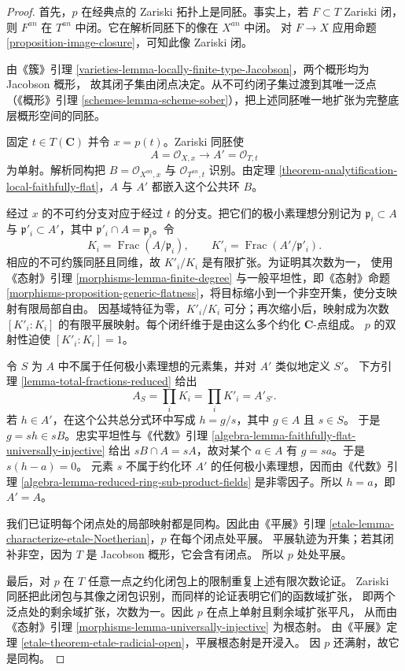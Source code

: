 \begin{proof}
首先，$p$ 在经典点的 Zariski 拓扑上是同胚。事实上，若 $F\subset T$ Zariski 闭，
则 $F^{an}$ 在 $T^{an}$ 中闭。它在解析同胚下的像在 $X^{an}$ 中闭。
对 $F\to X$ 应用命题 \ref{proposition-image-closure}，可知此像 Zariski 闭。

由《簇》引理 \ref{varieties-lemma-locally-finite-type-Jacobson}，两个概形均为 Jacobson 概形，
故其闭子集由闭点决定。从不可约闭子集过渡到其唯一泛点（《概形》引理
\ref{schemes-lemma-scheme-sober}），把上述同胚唯一地扩张为完整底层概形空间的同胚。

固定 $t\in T(\mathbf C)$ 并令 $x=p(t)$。Zariski 同胚使
$$
A=\mathcal O_{X,x}\longrightarrow A'=\mathcal O_{T,t}
$$
为单射。解析同构把 $B=\mathcal O_{X^{an},x}$ 与
$\mathcal O_{T^{an},t}$ 识别。由定理
\ref{theorem-analytification-local-faithfully-flat}，$A$ 与 $A'$ 都嵌入这个公共环 $B$。

经过 $x$ 的不可约分支对应于经过 $t$ 的分支。把它们的极小素理想分别记为
$\mathfrak p_i\subset A$ 与 $\mathfrak p'_i\subset A'$，其中
$\mathfrak p'_i\cap A=\mathfrak p_i$。令
$$
K_i=\operatorname{Frac}(A/\mathfrak p_i),
\qquad
K'_i=\operatorname{Frac}(A'/\mathfrak p'_i).
$$
相应的不可约簇同胚且同维，故 $K'_i/K_i$ 是有限扩张。为证明其次数为一，
使用《态射》引理 \ref{morphisms-lemma-finite-degree} 与一般平坦性，即《态射》命题
\ref{morphisms-proposition-generic-flatness}，将目标缩小到一个非空开集，使分支映射有限局部自由。
因基域特征为零，$K'_i/K_i$ 可分；再次缩小后，映射成为次数
$[K'_i:K_i]$ 的有限平展映射。每个闭纤维于是由这么多个约化 $\mathbf C$-点组成。
$p$ 的双射性迫使 $[K'_i:K_i]=1$。

令 $S$ 为 $A$ 中不属于任何极小素理想的元素集，并对 $A'$ 类似地定义 $S'$。
下方引理 \ref{lemma-total-fractions-reduced} 给出
$$
A_S=\prod_iK_i=\prod_iK'_i=A'_{S'}.
$$
若 $h\in A'$，在这个公共总分式环中写成 $h=g/s$，其中 $g\in A$ 且 $s\in S$。
于是 $g=sh\in sB$。忠实平坦性与《代数》引理
\ref{algebra-lemma-faithfully-flat-universally-injective} 给出
$sB\cap A=sA$，故对某个 $a\in A$ 有 $g=sa$。于是 $s(h-a)=0$。
元素 $s$ 不属于约化环 $A'$ 的任何极小素理想，因而由《代数》引理
\ref{algebra-lemma-reduced-ring-sub-product-fields} 是非零因子。所以 $h=a$，即 $A'=A$。

我们已证明每个闭点处的局部映射都是同构。因此由《平展》引理
\ref{etale-lemma-characterize-etale-Noetherian}，$p$ 在每个闭点处平展。
平展轨迹为开集；若其闭补非空，因为 $T$ 是 Jacobson 概形，它会含有闭点。
所以 $p$ 处处平展。

最后，对 $p$ 在 $T$ 任意一点之约化闭包上的限制重复上述有限次数论证。
Zariski 同胚把此闭包与其像之闭包识别，而同样的论证表明它们的函数域扩张，
即两个泛点处的剩余域扩张，次数为一。因此 $p$ 在点上单射且剩余域扩张平凡，
从而由《态射》引理 \ref{morphisms-lemma-universally-injective} 为根态射。
由《平展》定理 \ref{etale-theorem-etale-radicial-open}，平展根态射是开浸入。
因 $p$ 还满射，故它是同构。
\end{proof}

